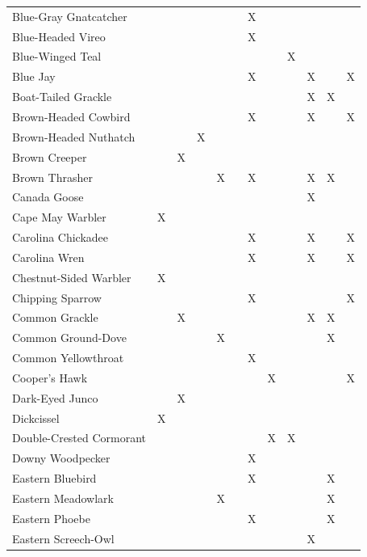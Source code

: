 \documentclass[]{article}
\begin{document}
\begin{longtable}{llllllllllll}
Blue-Gray Gnatcatcher &  &  &  &  &  & X &  &  &  &  & \\
Blue-Headed Vireo &  &  &  &  &  & X &  &  &  &  & \\
\addlinespace
Blue-Winged Teal &  &  &  &  &  &  &  & X &  &  & \\
Blue Jay &  &  &  &  &  & X &  &  & X &  & X\\
Boat-Tailed Grackle &  &  &  &  &  &  &  &  & X & X & \\
Brown-Headed Cowbird &  &  &  &  &  & X &  &  & X &  & X\\
Brown-Headed Nuthatch &  &  & X &  &  &  &  &  &  &  & \\
\addlinespace
Brown Creeper &  & X &  &  &  &  &  &  &  &  & \\
Brown Thrasher &  &  &  & X &  & X &  &  & X & X & \\
Canada Goose &  &  &  &  &  &  &  &  & X &  & \\
Cape May Warbler & X &  &  &  &  &  &  &  &  &  & \\
Carolina Chickadee &  &  &  &  &  & X &  &  & X &  & X\\
\addlinespace
Carolina Wren &  &  &  &  &  & X &  &  & X &  & X\\
Chestnut-Sided Warbler & X &  &  &  &  &  &  &  &  &  & \\
Chipping Sparrow &  &  &  &  &  & X &  &  &  &  & X\\
Common Grackle &  & X &  &  &  &  &  &  & X & X & \\
Common Ground-Dove &  &  &  & X &  &  &  &  &  & X & \\
\addlinespace
Common Yellowthroat &  &  &  &  &  & X &  &  &  &  & \\
Cooper's Hawk &  &  &  &  &  &  & X &  &  &  & X\\
Dark-Eyed Junco &  & X &  &  &  &  &  &  &  &  & \\
Dickcissel & X &  &  &  &  &  &  &  &  &  & \\
Double-Crested Cormorant &  &  &  &  &  &  & X & X &  &  & \\
\addlinespace
Downy Woodpecker &  &  &  &  &  & X &  &  &  &  & \\
Eastern Bluebird &  &  &  &  &  & X &  &  &  & X & \\
Eastern Meadowlark &  &  &  & X &  &  &  &  &  & X & \\
Eastern Phoebe &  &  &  &  &  & X &  &  &  & X & \\
Eastern Screech-Owl &  &  &  &  &  &  &  &  & X &  & \\

\end{longtable}
\end{document}
